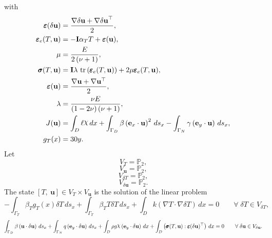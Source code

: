 \documentclass[preview]{standalone}
\let\oldcdot\cdot
\let\cdot\oldcdot
\begin{document}
with 
\begin{align*}
\pmb\varepsilon({\delta\mathbf{  u }}) &= \frac{ \nabla {\delta\mathbf{  u }}  +   \nabla {\delta\mathbf{  u }} ^\top }{2},\\
\pmb\varepsilon_{e}(T,{\mathbf{ u }}) &= - \mathbf{I} \alpha_{T} T + \bm\varepsilon({\mathbf{ u }}),\\
\mu &= \frac{E}{2 \left(\nu + 1\right)},\\
\pmb \sigma(T,{\mathbf{ u }}) &= \mathbf{I} \lambda  \,\operatorname{tr}\left(\pmb\varepsilon_{e}(T,{\mathbf{ u }})\right)  + 2 \mu \pmb\varepsilon_{e}(T,{\mathbf{ u }}),\\
\bm\varepsilon({\mathbf{ u }}) &= \frac{ \nabla {\mathbf{ u }}  +   \nabla {\mathbf{ u }} ^\top }{2},\\
\lambda &= \frac{\nu E}{\left(1 - 2 \nu\right) \left(\nu + 1\right)},\\
J({\mathbf{ u }}) &=  \int_{D} \ell \raisebox{\depth}{$\chi$} \,dx +  \int_{\Gamma_D} \beta \left( \mathbf e_x \cdot {\mathbf{ u }} \right)^{2} \,ds_x -  \int_{\Gamma_N} \gamma \left( \mathbf e_y \cdot {\mathbf{ u }} \right) \,ds_x,\\
g_{T}(x) &= 30 y.
 \end{align*}
Let
\begin{equation*}
V_{T} = \mathbb P_{2},\end{equation*}
\begin{equation*}
V_{{\mathbf{ u }}} = \mathbb P_{2},\end{equation*}
\begin{equation*}
V_{\delta T} = \mathbb P_{2},\end{equation*}
\begin{equation*}
V_{{\delta\mathbf{  u }}} = \mathbb P_{2}.\end{equation*}
The state $\left[ T, \  {\mathbf{ u }}\right] \in  V_{T}\times V_{{\mathbf{ u }}}$ is the solution of the linear problem
\begin{dmath*}
-  \int_{\Gamma_{T}} \beta_{T} g_{T}(x) \delta T \,ds_x +  \int_{\Gamma_{T}} \beta_{T} T \delta T \,ds_x +  \int_{D} k \left(  \nabla T  \cdot  \nabla \delta T  \right) \,dx = 0\qquad \forall\; {\delta T\in V_{\delta T}} , 
\end{dmath*}
\begin{dmath*}
 \int_{\Gamma_D} \beta \left( {\mathbf{ u }} \cdot {\delta\mathbf{  u }} \right) \,ds_x +  \int_{\Gamma_N} q \left( \mathbf e_y \cdot {\delta\mathbf{  u }} \right) \,ds_x +  \int_{D} \rho g \raisebox{\depth}{$\chi$} \left( \mathbf e_y \cdot {\delta\mathbf{  u }} \right) \,dx +  \int_{D} \left( \pmb \sigma(T,{\mathbf{ u }}) \mathrel{:}  \pmb\varepsilon({\delta\mathbf{  u }})^\top  \right) \,dx = 0\qquad \forall\; {{\delta\mathbf{  u }}\in V_{{\delta\mathbf{  u }}}} . 
\end{dmath*}
\end{document}
